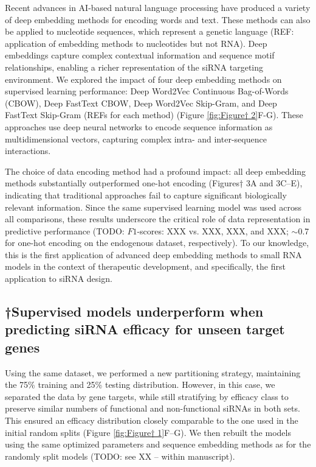 \documentclass{report}
\begin{document}
Recent advances in AI-based natural language processing have produced a variety of deep embedding methods for encoding words and text. These methods can also be applied to nucleotide sequences, which represent a genetic language (REF: application of embedding methods to nucleotides but not RNA). Deep embeddings capture complex contextual information and sequence motif relationships, enabling a richer representation of the siRNA targeting environment. We explored the impact of four deep embedding methods on supervised learning performance: Deep Word2Vec Continuous Bag-of-Words (CBOW), Deep FastText CBOW, Deep Word2Vec Skip-Gram, and Deep FastText Skip-Gram (REFs for each method) (Figure \ref{fig:Figure† 2}F-G). These approaches use deep neural networks to encode sequence information as multidimensional vectors, capturing complex intra- and inter-sequence interactions.

The choice of data encoding method had a profound impact: all deep embedding methods substantially outperformed one-hot encoding (Figures† 3A and 3C–E), indicating that traditional approaches fail to capture significant biologically relevant information. Since the same supervised learning model was used across all comparisons, these results underscore the critical role of data representation in predictive performance (TODO: $F1$-scores: XXX vs. XXX, XXX, and XXX; $\sim$0.7 for one-hot encoding on the endogenous dataset, respectively). To our knowledge, this is the first application of advanced deep embedding methods to small RNA models in the context of therapeutic development, and specifically, the first application to siRNA design.

\subsection{†Supervised models underperform when predicting siRNA efficacy for unseen target genes}

Using the same dataset, we performed a new partitioning strategy, maintaining the 75\% training and 25\% testing distribution. However, in this case, we separated the data by gene targets, while still stratifying by efficacy class to preserve similar numbers of functional and non-functional siRNAs in both sets. This ensured an efficacy distribution closely comparable to the one used in the initial random splits (Figure \ref{fig:Figure† 1}F–G). We then rebuilt the models using the same optimized parameters and sequence embedding methods as for the randomly split models (TODO: see XX – within manuscript). 
\end{document}
